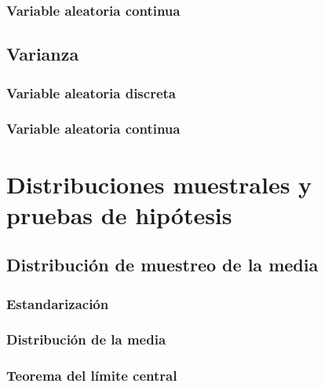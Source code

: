 \documentclass[
]{book}
\begin{document}
\hypertarget{variable-aleatoria-continua-1}{%
\subsection{Variable aleatoria continua}\label{variable-aleatoria-continua-1}}

\hypertarget{varianza}{%
\section{Varianza}\label{varianza}}

\hypertarget{variable-aleatoria-discreta-2}{%
\subsection{Variable aleatoria discreta}\label{variable-aleatoria-discreta-2}}

\hypertarget{variable-aleatoria-continua-2}{%
\subsection{Variable aleatoria continua}\label{variable-aleatoria-continua-2}}

\hypertarget{distribuciones-muestrales-y-pruebas-de-hipuxf3tesis}{%
\chapter{Distribuciones muestrales y pruebas de hipótesis}\label{distribuciones-muestrales-y-pruebas-de-hipuxf3tesis}}

\hypertarget{distribuciuxf3n-de-muestreo-de-la-media}{%
\section{Distribución de muestreo de la media}\label{distribuciuxf3n-de-muestreo-de-la-media}}

\hypertarget{estandarizaciuxf3n}{%
\subsection{Estandarización}\label{estandarizaciuxf3n}}

\hypertarget{distribuciuxf3n-de-la-media}{%
\subsection{Distribución de la media}\label{distribuciuxf3n-de-la-media}}

\hypertarget{teorema-del-luxedmite-central}{%
\subsection{Teorema del límite central}\label{teorema-del-luxedmite-central}}
\end{document}
